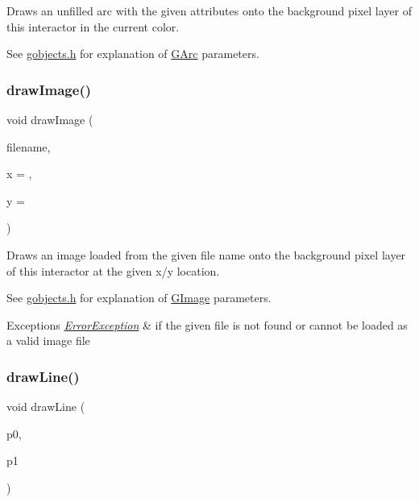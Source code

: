 Draws an unfilled arc with the given attributes onto the background pixel layer of this interactor in the current color. 

See \mbox{\hyperlink{gobjects_8h_source}{gobjects.\+h}} for explanation of \mbox{\hyperlink{classGArc}{G\+Arc}} parameters. \mbox{\label{classGDrawingSurface_abdd4cb1f2c64adc5d03522a1ee30febf}} 
\subsubsection{\texorpdfstring{draw\+Image()}{drawImage()}}
{\footnotesize\ttfamily void draw\+Image (\begin{DoxyParamCaption}\item[{const std\+::string \&}]{filename,  }\item[{double}]{x = {},  }\item[{double}]{y = {} }\end{DoxyParamCaption})\hspace{0.3cm}{\ttfamily [virtual]}}



Draws an image loaded from the given file name onto the background pixel layer of this interactor at the given x/y location. 

See \mbox{\hyperlink{gobjects_8h_source}{gobjects.\+h}} for explanation of \mbox{\hyperlink{classGImage}{G\+Image}} parameters. 
\begin{DoxyExceptions}{Exceptions}
{\em \mbox{\hyperlink{classErrorException}{Error\+Exception}}} & if the given file is not found or cannot be loaded as a valid image file \\
\hline
\end{DoxyExceptions}
\mbox{\label{classGDrawingSurface_ae6a24b6b9a6e795d3165c1c750d5bdf1}} 
\subsubsection{\texorpdfstring{draw\+Line()}{drawLine()}\hspace{0.1cm}{\footnotesize\ttfamily [1/2]}}
{\footnotesize\ttfamily void draw\+Line (\begin{DoxyParamCaption}\item[{const \mbox{\hyperlink{classGPoint}{G\+Point}} \&}]{p0,  }\item[{const \mbox{\hyperlink{classGPoint}{G\+Point}} \&}]{p1 }\end{DoxyParamCaption})\hspace{0.3cm}{\ttfamily [virtual]}}




